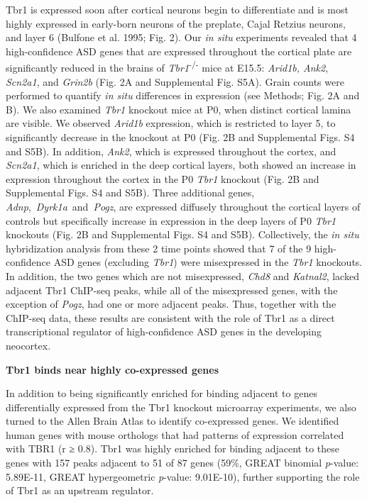\documentclass[]{article}
\begin{document}
Tbr1 is expressed soon after cortical neurons begin to differentiate and
is most highly expressed in early-born neurons of the preplate, Cajal
Retzius neurons, and layer 6 (Bulfone et al. 1995; Fig. 2). Our \emph{in
situ} experiments revealed that 4 high-confidence ASD genes that are
expressed throughout the cortical plate are significantly reduced in the
brains of \emph{Tbr1}\textsuperscript{-/-} mice at E15.5: \emph{Arid1b,
Ank2}, \emph{Scn2a1}, and \emph{Grin2b} (Fig. 2A and Supplemental Fig.
S5A). Grain counts were performed to quantify \emph{in situ} differences
in expression (see Methods; Fig. 2A and B). We also examined \emph{Tbr1}
knockout mice at P0, when distinct cortical lamina are visible. We
observed \emph{Arid1b} expression, which is restricted to layer 5, to
significantly decrease in the knockout at P0 (Fig. 2B and Supplemental
Figs. S4 and S5B). In addition, \emph{Ank2}, which is expressed
throughout the cortex, and \emph{Scn2a1}, which is enriched in the deep
cortical layers, both showed an increase in expression throughout the
cortex in the P0 \emph{Tbr1} knockout (Fig. 2B and Supplemental Figs. S4
and S5B). Three additional genes,
\emph{Adnp},~\emph{Dyrk1a}~and~\emph{Pogz}, are expressed diffusely
throughout the cortical layers of controls but specifically increase in
expression in the deep layers of P0 \emph{Tbr1} knockouts (Fig. 2B and
Supplemental Figs. S4 and S5B). Collectively, the \emph{in situ}
hybridization analysis from these 2 time points showed that 7 of the 9
high-confidence ASD genes (excluding \emph{Tbr1}) were misexpressed in
the \emph{Tbr1} knockouts. In addition, the two genes which are not
misexpressed, \emph{Chd8} and \emph{Katnal2}, lacked adjacent Tbr1
ChIP-seq peaks, while all of the misexpressed genes, with the exception
of \emph{Pogz}, had one or more adjacent peaks. Thus, together with the
ChIP-seq data, these results are consistent with the role of Tbr1 as a
direct transcriptional regulator of high-confidence ASD genes in the
developing neocortex.

\textbf{Tbr1 binds near highly co-expressed genes}

In addition to being significantly enriched for binding adjacent to
genes differentially expressed from the Tbr1 knockout microarray
experiments, we also turned to the Allen Brain Atlas to identify
co-expressed genes. We identified human genes with mouse orthologs that
had patterns of expression correlated with TBR1 (r ≥ 0.8). Tbr1 was
highly enriched for binding adjacent to these genes with 157 peaks
adjacent to 51 of 87 genes (59\%, GREAT binomial \emph{p}-value:
5.89E-11, GREAT hypergeometric \emph{p}-value: 9.01E-10), further
supporting the role of Tbr1 as an upstream regulator.
\end{document}
